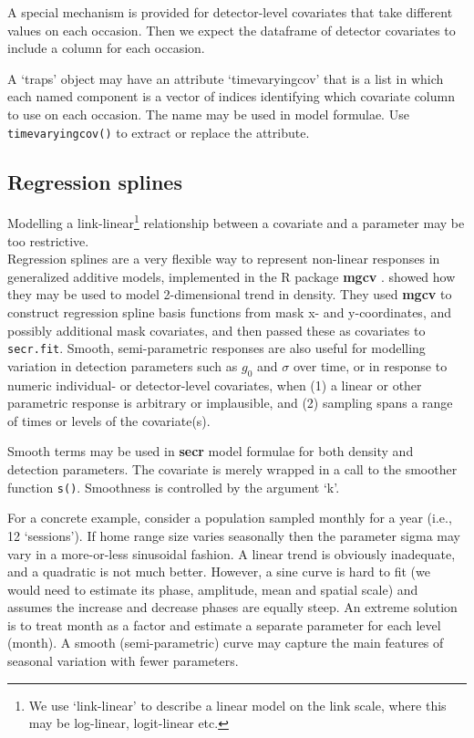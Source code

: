 \documentclass[
]{book}
\begin{document}

A special mechanism is provided for detector-level covariates that take different values on each occasion. Then we expect the dataframe of detector covariates to include a column for each occasion.

A `traps' object may have an attribute `timevaryingcov' that is a list in which each named component is a vector of indices identifying which covariate column to use on each occasion. The name may be used in model formulae. Use \texttt{timevaryingcov()} to extract or replace the attribute.

\subsection{Regression splines}\label{regression-splines}


Modelling a link-linear\footnote{We use `link-linear' to describe a linear model on the link scale, where this may be log-linear, logit-linear etc.} relationship between a covariate and a parameter may be too restrictive.\\
Regression splines are a very flexible way to represent non-linear responses in generalized additive models, implemented in the R package \textbf{mgcv} \citep{w06}. \citet{bk14} showed how they may be used to model 2-dimensional trend in density. They used \textbf{mgcv} to construct regression spline basis functions from mask x- and y-coordinates, and possibly additional mask covariates, and then passed these as covariates to \texttt{secr.fit}. Smooth, semi-parametric responses are also useful for modelling variation in detection parameters such as \(g_0\) and \(\sigma\) over time, or in response to numeric individual- or detector-level covariates, when (1) a linear or other parametric response is arbitrary or implausible, and (2) sampling spans a range of times or levels of the covariate(s).

Smooth terms may be used in \textbf{secr} model formulae for both density and detection parameters. The covariate is merely wrapped in a call to the smoother function \texttt{s()}. Smoothness is controlled by the argument `k'.

For a concrete example, consider a population sampled monthly for a year (i.e., 12 `sessions'). If home range size varies seasonally then the parameter sigma may vary in a more-or-less sinusoidal fashion. A linear trend is obviously inadequate, and a quadratic is not much better. However, a sine curve is hard to fit (we would need to estimate its phase, amplitude, mean and spatial scale) and assumes the increase and decrease phases are equally steep. An extreme solution is to treat month as a factor and estimate a separate parameter for each level (month). A smooth (semi-parametric) curve may capture the main features of seasonal variation with fewer parameters.
\end{document}
